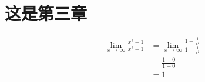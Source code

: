 \section{这是第三章}

\begin{theorem}
\begin{align*}
    \lim_{x \to \infty} \frac{x^2+1}{x^2-1} 
    &= \lim_{x \to \infty} \frac{1+\frac{1}{x^2}}{1-\frac{1}{x^2}}\\
    &= \frac{1+0}{1-0}\\
    &= 1
\end{align*}
\end{theorem}